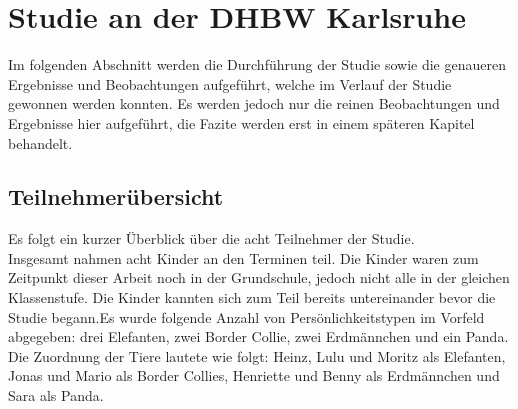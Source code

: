 \chapter{Studie an der DHBW Karlsruhe}
	Im folgenden Abschnitt werden die Durchführung der Studie sowie die genaueren Ergebnisse und Beobachtungen aufgeführt, welche im Verlauf der Studie gewonnen werden konnten. Es werden jedoch nur die reinen Beobachtungen und Ergebnisse hier aufgeführt, die Fazite werden erst in einem späteren Kapitel behandelt.
\section{Teilnehmerübersicht}
	Es folgt ein kurzer Überblick über die acht Teilnehmer der Studie.\\
	Insgesamt nahmen acht Kinder an den Terminen teil. Die Kinder waren zum Zeitpunkt dieser Arbeit noch in der Grundschule, jedoch nicht alle in der gleichen Klassenstufe. Die Kinder kannten sich zum Teil bereits untereinander bevor die Studie begann.Es wurde folgende Anzahl von Persönlichkeitstypen im Vorfeld abgegeben: drei Elefanten, zwei Border Collie, zwei Erdmännchen und ein Panda. Die Zuordnung der Tiere lautete wie folgt: Heinz, Lulu und Moritz als Elefanten, Jonas und Mario als Border Collies, Henriette und Benny als Erdmännchen und Sara als Panda.\\
	
